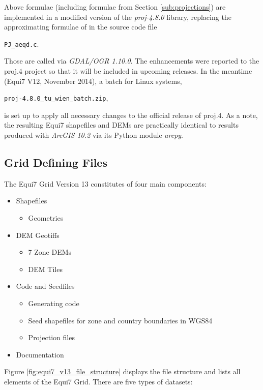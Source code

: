 \documentclass[10pt,a4paper]{article}
\begin{document}
Above formulae (including formulae from Section \ref{sub:projections}) are implemented in a modified version of the \textit{proj-4.8.0} library, replacing the approximating formulae of \citep{Snyder1987} in the source code file

\texttt{PJ\_aeqd.c}. 

Those are called via \textit{GDAL/OGR 1.10.0}. The enhancements were reported to the proj.4 project so that it will be included in upcoming releases. In the meantime (Equi7 V12, November 2014), a batch for Linux systems, 

\texttt{proj-4.8.0\_tu\_wien\_batch.zip},

is set up to apply all necessary changes to the official release of proj.4. As a note, the resulting Equi7 shapefiles and DEMs are practically identical to results produced with \textit{ArcGIS 10.2} via its Python module \textit{arcpy}.

\newpage

\subsection{Grid Defining Files}
\label{definingfiles}

The Equi7 Grid Version 13 constitutes of four main components:

\begin{itemize}[itemsep=0.1ex]
\item Shapefiles
\begin{itemize}
\item Geometries
\end{itemize}
\item DEM Geotiffs
\begin{itemize}
\item 7 Zone DEMs
\item DEM Tiles
\end{itemize}
\item Code and Seedfiles
\begin{itemize}
\item Generating code
\item Seed shapefiles for zone and country boundaries in WGS84
\item Projection files
\end{itemize}
\item Documentation
\end{itemize}

Figure \ref{fig:equi7_v13_file_structure} displays the file structure and lists all elements of the Equi7 Grid. There are five types of datasets:
\end{document}
